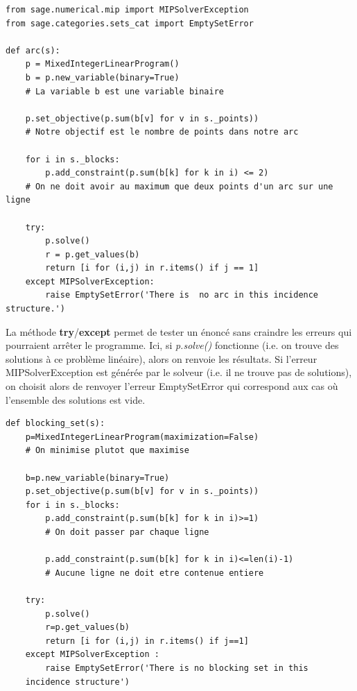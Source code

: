 \documentclass[a4paper]{article}
\begin{document}
\begin{lstlisting}
from sage.numerical.mip import MIPSolverException
from sage.categories.sets_cat import EmptySetError
          
def arc(s):   
    p = MixedIntegerLinearProgram()
    b = p.new_variable(binary=True)
    # La variable b est une variable binaire 

    p.set_objective(p.sum(b[v] for v in s._points))
    # Notre objectif est le nombre de points dans notre arc 

    for i in s._blocks:
        p.add_constraint(p.sum(b[k] for k in i) <= 2)
    # On ne doit avoir au maximum que deux points d'un arc sur une ligne 
        
    try:
        p.solve()
        r = p.get_values(b)
        return [i for (i,j) in r.items() if j == 1]
    except MIPSolverException:
        raise EmptySetError('There is  no arc in this incidence structure.')
\end{lstlisting}
La méthode \textbf{try}/\textbf{except} permet de tester un énoncé sans craindre les erreurs qui pourraient arrêter le programme. Ici, si \textit{p.solve()} fonctionne (i.e. on trouve des solutions à ce problème linéaire), alors on renvoie les résultats. Si l'erreur MIPSolverException est générée par le solveur (i.e. il ne trouve pas de solutions), on choisit alors de renvoyer l'erreur EmptySetError qui correspond aux cas où l'ensemble des solutions est vide.
\newpage
\begin{lstlisting}
def blocking_set(s):
    p=MixedIntegerLinearProgram(maximization=False)
    # On minimise plutot que maximise 

    b=p.new_variable(binary=True)
    p.set_objective(p.sum(b[v] for v in s._points))
    for i in s._blocks:
        p.add_constraint(p.sum(b[k] for k in i)>=1)
        # On doit passer par chaque ligne

        p.add_constraint(p.sum(b[k] for k in i)<=len(i)-1)
        # Aucune ligne ne doit etre contenue entiere 
        
    try:
        p.solve()
        r=p.get_values(b)
        return [i for (i,j) in r.items() if j==1]
    except MIPSolverException :
        raise EmptySetError('There is no blocking set in this
    incidence structure')  
\end{lstlisting}
\vspace{1\baselineskip}
\end{document}

